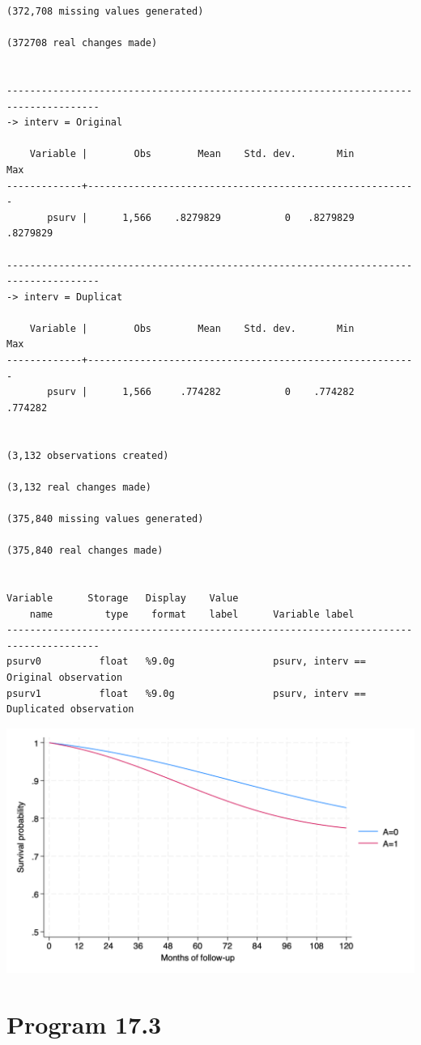 \documentclass[
  10pt,
  a4paper,
]{book}
\begin{document}
\begin{verbatim}
(372,708 missing values generated)

(372708 real changes made)


--------------------------------------------------------------------------------------
-> interv = Original

    Variable |        Obs        Mean    Std. dev.       Min        Max
-------------+---------------------------------------------------------
       psurv |      1,566    .8279829           0   .8279829   .8279829

--------------------------------------------------------------------------------------
-> interv = Duplicat

    Variable |        Obs        Mean    Std. dev.       Min        Max
-------------+---------------------------------------------------------
       psurv |      1,566     .774282           0    .774282    .774282


(3,132 observations created)

(3,132 real changes made)

(375,840 missing values generated)

(375,840 real changes made)


Variable      Storage   Display    Value
    name         type    format    label      Variable label
--------------------------------------------------------------------------------------
psurv0          float   %9.0g                 psurv, interv == Original observation
psurv1          float   %9.0g                 psurv, interv == Duplicated observation
\end{verbatim}

\begin{center}\includegraphics[width=0.85\linewidth]{./figs/stata-fig-17-2} \end{center}

\section{Program 17.3}\label{program-17.3-1}
\end{document}
